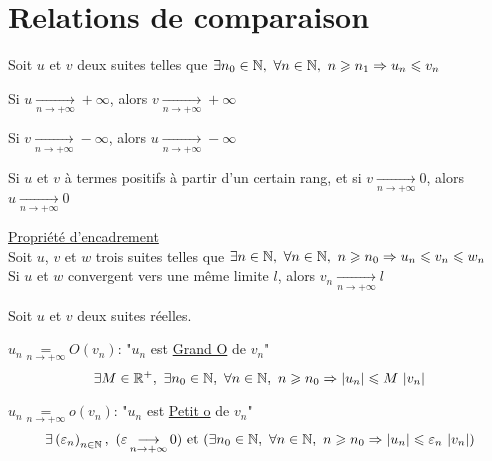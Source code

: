 \documentclass[12pt,twoside,a4paper]{article}
\begin{document}
	\section{Relations de comparaison}
		\begin{prop}
			Soit $u$ et $v$ deux suites telles que $\exists n_0\in\N,\ \forall n\in\N,\ n\geqslant n_1\Rightarrow u_n\leqslant v_n$
			\begin{liste}
				\item Si $u\mathop{\longrightarrow}\limits_{n\rightarrow+\infty}+\infty$, alors $v\mathop{\longrightarrow}\limits_{n\rightarrow+\infty}+\infty$
				\item Si $v\mathop{\longrightarrow}\limits_{n\rightarrow+\infty}-\infty$, alors $u\mathop{\longrightarrow}\limits_{n\rightarrow+\infty}-\infty$
				\item Si $u$ et $v$ \`a termes positifs \`a partir d'un certain rang, et si $v\mathop{\longrightarrow}\limits_{n\rightarrow+\infty}0$, alors $u\mathop{\longrightarrow}\limits_{n\rightarrow+\infty}0$
			\end{liste}
		\end{prop}
		\begin{prop}
			\underline{Propriété d'encadrement}\\
			Soit $u$, $v$ et $w$ trois suites telles que $\exists n\in\N,\ \forall n\in\N,\ n\geqslant n_0\Rightarrow u_n\leqslant v_n\leqslant w_n$\\
			Si $u$ et $w$ convergent vers une m\^eme limite $l$, alors $v_n\mathop{\longrightarrow}\limits_{n\rightarrow+\infty}l$
		\end{prop}
		\begin{defi}
			Soit $u$ et $v$ deux suites réelles.
			\begin{liste}
				\item $u_n\mathop{=}\limits_{n\rightarrow+\infty}O(v_n)$: "$u_n$ est \underline{Grand O} de $v_n$"\\
					$$\exists M\in\R^+,\ \exists n_0\in\N,\ \forall n\in\N,\ n\geqslant n_0\Rightarrow\left|u_n\right|\leqslant M\,\left|v_n\right|$$
				\item $u_n\mathop{=}\limits_{n\rightarrow+\infty}o(v_n)$: "$u_n$ est \underline{Petit o} de $v_n$"\\
					$$\exists \left(\varepsilon_n\right)_{n\in\N},\ (\varepsilon\mathop{\longrightarrow}\limits_{n\rightarrow+\infty}0)\et(\exists n_0\in\N,\ \forall n\in\N,\ n\geqslant n_0\Rightarrow\left|u_n\right|\leqslant \varepsilon_n\,\left|v_n\right|)$$
			\end{liste}
		\end{defi} %
\end{document}
